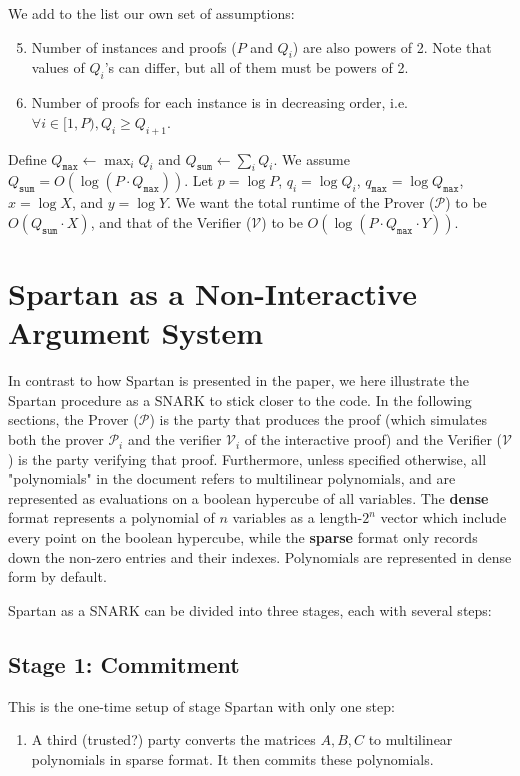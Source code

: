 \documentclass{article}
\newcommand{\red}[1] {\color{red}#1\color{black}}
\newcommand{\Qsum}{Q_{\mathtt{sum}}}
\newcommand{\Qmax}{Q_{\mathtt{max}}}
\newcommand{\qmax}{q_{\mathtt{max}}}
\renewcommand{\P}{\mathcal{P}}
\newcommand{\V}{\mathcal{V}}
\begin{document}
\noindent We add to the list our own set of assumptions:
\begin{enumerate}
    \setcounter{enumi}{4}
    \item Number of instances and proofs ($P$ and $Q_i$) are also powers of 2. Note that values of $Q_i$'s can differ, but all of them must be powers of 2. \label{ass:p_q_pow2}
    \item Number of proofs for each instance is in decreasing order, i.e. $\forall i\in [1, P), Q_i \geq Q_{i+1}$. \label{ass:q_decreasing}
\end{enumerate}

Define $\Qmax \leftarrow \max_i Q_i$ and $\Qsum \leftarrow \sum_i Q_i$. We assume $\Qsum = O(\log (P \cdot \Qmax))$. Let $p = \log P$, $q_i = \log Q_i$, $\qmax = \log \Qmax$, $x = \log X$, and $y = \log Y$. We want the total runtime of the Prover ($\P$) to be $O(\Qsum \cdot X)$, and that of the Verifier ($\V$) to be $O(\log(P \cdot \Qmax \cdot Y))$.

\section{Spartan as a Non-Interactive Argument System}\label{spartan}
In contrast to how Spartan is presented in the paper, we here illustrate the Spartan procedure as a SNARK to stick closer to the code. In the following sections, the Prover ($\P$) is the party that produces the proof (which simulates both the prover $\P_i$ and the verifier $\V_i$ of the interactive proof) and the Verifier ($\V$) is the party verifying that proof. Furthermore, unless specified otherwise, all "polynomials" in the document refers to multilinear polynomials, and are represented as evaluations on a boolean hypercube of all variables. The \textbf{dense} format represents a polynomial of $n$ variables as a length-$2^n$ vector which include every point on the boolean hypercube, while the \textbf{sparse} format only records down the non-zero entries and their indexes. Polynomials are represented in dense form by default.

Spartan as a SNARK can be divided into three stages, each with several steps:
\subsection{Stage 1: Commitment}
This is the one-time setup of stage Spartan with only one step:
\begin{enumerate}
    \item A third (\red{trusted?}) party converts the matrices $A, B, C$ to multilinear polynomials in sparse format. It then commits these polynomials.
\end{enumerate}
\end{document}
